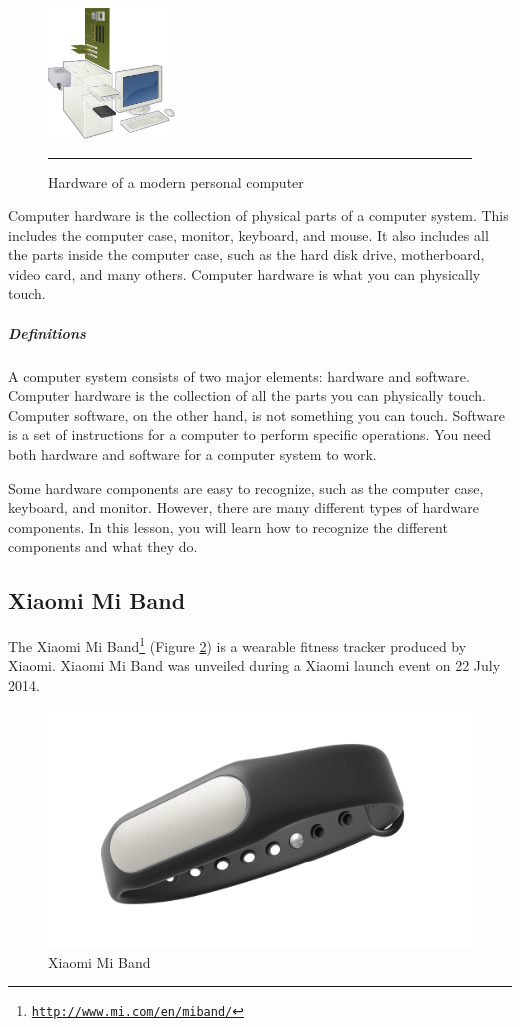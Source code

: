 \begin{figure}
	\begin{center}
		\includegraphics[width=0.3\textwidth]{./images/hardware.jpg}
	\end{center}
	\rule{0.3\textwidth}{0.5pt}
	\caption{Hardware of a modern personal computer}
	\label{fig:hardware}
\end{figure}

Computer hardware is the collection of physical parts of a computer system. This includes the computer case, monitor, keyboard, and mouse. It also includes all the parts inside the computer case, such as the hard disk drive, motherboard, video card, and many others. Computer hardware is what you can physically touch.\cite{10}
\subparagraph*{Definitions}
\hfill \break
A computer system consists of two major elements: hardware and software. Computer hardware is the collection of all the parts you can physically touch. Computer software, on the other hand, is not something you can touch. Software is a set of instructions for a computer to perform specific operations. You need both hardware and software for a computer system to work.

Some hardware components are easy to recognize, such as the computer case, keyboard, and monitor. However, there are many different types of hardware components. In this lesson, you will learn how to recognize the different components and what they do.\cite{10}
\subsection{Xiaomi Mi Band}

The Xiaomi Mi Band\footnote{\href{http://www.mi.com/en/miband/}{\texttt{http://www.mi.com/en/miband/}}} (Figure \ref{fig:smartband}) is a wearable fitness tracker produced by Xiaomi. Xiaomi Mi Band was unveiled during a Xiaomi launch event on 22 July 2014.
\begin{figure}[h]
	\centering
	\includegraphics[width=0.7\linewidth]{images/smartband}
	\caption{Xiaomi Mi Band}
	\label{fig:smartband}
\end{figure}

